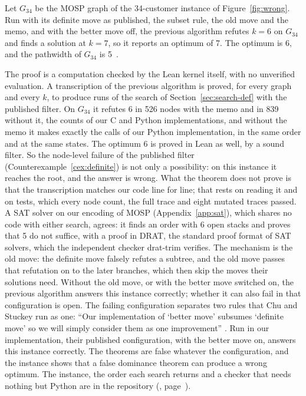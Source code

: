 \begin{theorem}\label{thm:wrong}
Let $G_{34}$ be the MOSP graph of the 34-customer instance of
Figure~\ref{fig:wrong}. Run with its definite move as published, the subset
rule, the old move and the memo, and with the better move off, the previous
algorithm refutes $k=6$ on $G_{34}$ and finds a solution at $k=7$, so it
reports an optimum of 7. The optimum is 6, and the pathwidth of $G_{34}$ is
5~.
\end{theorem}

The proof is a computation checked by the Lean kernel itself, with no
unverified evaluation. A transcription of the previous algorithm is proved, for
every graph and every $k$, to produce runs of the search of
Section~\ref{sec:search-def} with the published filter. On $G_{34}$ it refutes
6 in 526 nodes with the memo and in 839 without it, the counts of our C and
Python implementations, and without the memo it makes exactly the calls of our
Python implementation, in the same order and at the same states. The optimum 6
is proved in Lean as well, by a sound filter. So the node-level failure of the
published filter (Counterexample~\ref{cex:definite}) is not only a possibility:
on this instance it reaches the root, and the answer is wrong. What the theorem
does not prove is that the transcription matches our code line for line; that
rests on reading it and on tests, which every node count, the full trace and
eight mutated traces passed. A SAT solver on our encoding of MOSP
(Appendix~\ref{app:sat}), which shares no code with either search, agrees: it
finds an order with 6 open stacks and proves that 5 do not suffice, with a proof in DRAT, the standard proof format of SAT solvers, which the independent checker drat-trim verifies. The mechanism is the old move: the definite
move falsely refutes a subtree, and the old move passes that refutation on to
the later branches, which then skip the moves their solutions need. Without the
old move, or with the better move switched on, the previous algorithm answers
this instance correctly; whether it can also fail in that configuration is
open. The failing configuration separates two rules that Chu and Stuckey run as
one: ``Our implementation of `better move' subsumes `definite move' so we will
simply consider them as one improvement'' \citep[p.~6]{ChuStuckey2009}. Run in our implementation, their published configuration, with the better move on, answers this instance correctly. The
theorems are false whatever the configuration, and the instance shows that a
false dominance theorem can produce a wrong optimum. The instance, the order each search returns and a checker
that needs nothing but Python are in the repository
(, page~\pageref{sec:data}).

